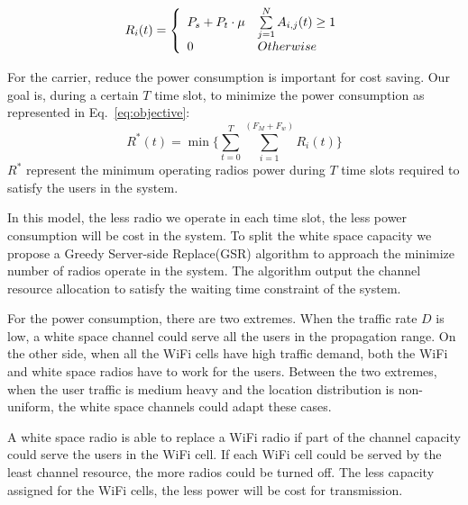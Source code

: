 \begin{equation}
\label{eq:radio}
 R_i(t) = \left\{ 
	  \begin{array}{l l}
	    P_s+P_t\cdot\mu   &  \sum\limits_{j=1}^N A_{i,j}(t) \ge 1\\
		0 &  Otherwise
			    \end{array} \right.
\end{equation}


For the carrier, reduce the power consumption is important for cost saving.
Our goal is, during a certain $T$ time slot, to minimize the power consumption as represented in Eq.~\ref{eq:objective}:
\begin{equation}
\label{eq:objective}
R^*(t) = \min{\{\sum\limits_{t=0}^{T}\sum\limits_{i=1}^{(F_M+F_w)} R_{i}}(t)\}
\end{equation}
$R^*$ represent the minimum operating radios power during $T$ time slots required to satisfy the 
users in the system. 

In this model, the less radio we operate in each time slot, the less power consumption will be cost in the system.
To split the white space capacity we propose a Greedy Server-side Replace(GSR) algorithm to approach the minimize 
number of radios operate in the system. The algorithm output the channel resource allocation to satisfy the waiting 
time constraint of the system.


For the power consumption, there are two extremes. When the traffic rate $D$ is low, a white space channel could 
serve all the users in the propagation range. On the other side, when all the WiFi cells have high traffic demand, 
both the WiFi and white space radios have to work for the users. Between the two extremes, when the user traffic 
is medium heavy and the location distribution is non-uniform, the white space channels could adapt these cases.

A white space radio is able to replace a WiFi radio if part of the channel capacity could serve the users in the 
WiFi cell. If each WiFi cell could be served by the least channel resource, the more radios could be turned off. 
The less capacity assigned for the WiFi cells, the less power will be cost for transmission.



